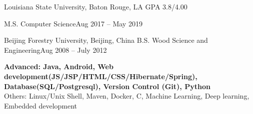 \documentclass[10pt,a4paper]{article}
\begin{document}

\spacedhrule{0em}{-1em}

%
%


\headedsection
{Louisiana State University, Baton Rouge, LA}
{GPA 3.8/4.00}{

  \headedsubsection
  {M.S. Computer Science}{Aug 2017
    -- May 2019}{}
}
\vspace{0.1em}
\headedsection
{Beijing Forestry University, Beijing, China}{
	\headedsubsection
  {B.S. Wood Science and Engineering}{Aug 2008 -- July 2012}{}
}


\spacedhrule{0.1em}{-0.8em}
\textbf{Advanced: Java, Android, Web development(JS/JSP/HTML/CSS/Hibernate/Spring), Database(SQL/Postgresql), Version Control (Git), Python}\\
Others: Linux/Unix Shell, Maven, Docker, C, Machine Learning, Deep learning, Embedded development
\end{document}
